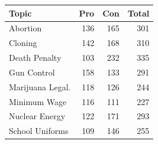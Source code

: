 \begin{tabular}{lrrr}
  \toprule
  Topic & Pro & Con & Total \\
  \midrule
  Abortion          & 136 & 165 & 301 \\
  Cloning           & 142 & 168 & 310 \\
  Death Penalty     & 103 & 232 & 335 \\
  Gun Control       & 158 & 133 & 291 \\
  Marijuana Legal.  & 118 & 126 & 244 \\
  Minimum Wage      & 116 & 111 & 227 \\
  Nuclear Energy    & 122 & 171 & 293 \\
  School Uniforms   & 109 & 146 & 255 \\
  \bottomrule
\end{tabular}
